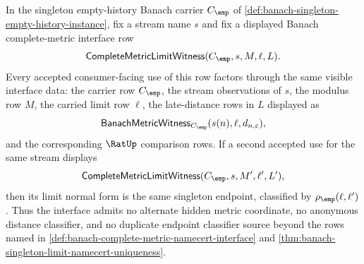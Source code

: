 \begin{corollary}
\label{cor:banach-complete-metric-interface-determinacy}
In the singleton empty-history Banach carrier $C_{\emp}$ of
\autoref{def:banach-singleton-empty-history-instance}, fix a stream name $s$ and
fix a displayed Banach complete-metric interface row
$$
\mathsf{CompleteMetricLimitWitness}(C_{\emp},s,M,\ell,L).
$$
Every accepted consumer-facing use of this row factors through the same visible
interface data: the carrier row $C_{\emp}$, the stream observations of $s$, the
modulus row $M$, the carried limit row $\ell$, the late-distance rows in $L$
displayed as
$$
\mathsf{BanachMetricWitness}_{C_{\emp}}(s(n),\ell,d_{n,\varepsilon}),
$$
and the corresponding $\RatUp$ comparison rows. If a second accepted use for
the same stream displays
$$
\mathsf{CompleteMetricLimitWitness}(C_{\emp},s,M',\ell',L'),
$$
then its limit normal form is the same singleton endpoint, classified by
$\rho_{\emp}(\ell,\ell')$. Thus the interface admits no alternate hidden metric
coordinate, no anonymous distance classifier, and no duplicate endpoint
classifier source beyond the rows named in
\autoref{def:banach-complete-metric-namecert-interface} and
\autoref{thm:banach-singleton-limit-namecert-uniqueness}.
\end{corollary}
